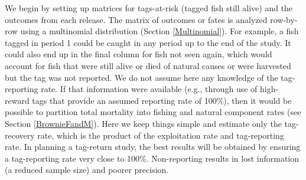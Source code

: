 \documentclass[
]{krantz}
\begin{document}
We begin by setting up matrices for tags-at-risk (tagged fish still alive) and the outcomes from each release. The matrix of outcomes or fates is analyzed row-by-row using a multinomial distribution (Section \ref{Multinomial}). For example, a fish tagged in period 1 could be caught in any period up to the end of the study. It could also end up in the final column for fish not seen again, which would account for fish that were still alive or died of natural causes or were harvested but the tag was not reported. We do not assume here any knowledge of the tag-reporting rate. If that information were available (e.g., through use of high-reward tags that provide an assumed reporting rate of 100\%), then it would be possible to partition total mortality into fishing and natural component rates (see Section \ref{BrownieFandM}). Here we keep things simple and estimate only the tag-recovery rate, which is the product of the exploitation rate and tag-reporting rate. In planning a tag-return study, the best results will be obtained by ensuring a tag-reporting rate very close to 100\%. Non-reporting results in lost information (a reduced sample size) and poorer precision.
\end{document}

